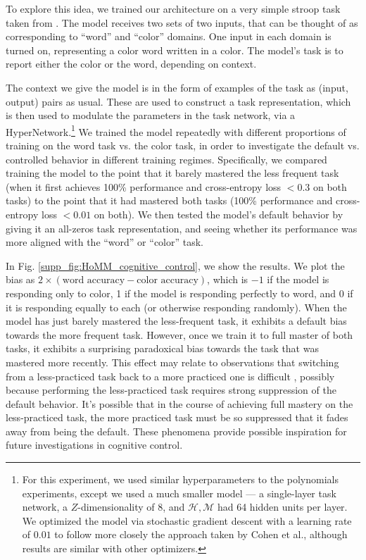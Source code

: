 To explore this idea, we trained our architecture on a very simple stroop task taken from \citet{Cohen1990}. The model receives two sets of two inputs, that can be thought of as corresponding to ``word'' and ``color'' domains. One input in each domain is turned on, representing a color word written in a color. The model's task is to report either the color or the word, depending on context.

The context we give the model is in the form of examples of the task as (input, output) pairs as usual. These are used to construct a task representation, which is then used to modulate the parameters in the task network, via a HyperNetwork.\footnote{For this experiment, we used similar hyperparameters to the polynomials experiments, except we used a much smaller model --- a single-layer task network, a $Z$-dimensionality of 8, and $\mathcal{H}, \mathcal{M}$ had 64 hidden units per layer. We optimized the model via stochastic gradient descent with a learning rate of \(0.01\) to follow more closely the approach taken by Cohen et al., although results are similar with other optimizers.} We trained the model repeatedly with different proportions of training on the word task vs. the color task, in order to investigate the default vs. controlled behavior in different training regimes. Specifically, we compared training the model to the point that it barely mastered the less frequent task (when it first achieves 100\% performance and cross-entropy loss \(< 0.3\) on both tasks) to the point that it had mastered both tasks (100\% performance and cross-entropy loss \(<0.01\) on both). We then tested the model's default behavior by giving it an all-zeros task representation, and seeing whether its performance was more aligned with the ``word'' or ``color'' task.

In Fig. \ref{supp_fig:HoMM_cognitive_control}, we show the results. We plot the bias as \(2 \times (\text{word accuracy} - \text{color accuracy})\), which is \(-1\) if the model is responding only to color, 1 if the model is responding perfectly to word, and 0 if it is responding equally to each (or otherwise responding randomly). When the model has just barely mastered the less-frequent task, it exhibits a default bias towards the more frequent task. However, once we train it to full master of both tasks, it exhibits a surprising paradoxical bias towards the task that was mastered more recently. This effect may relate to observations that switching from a less-practiced task back to a more practiced one is difficult \citep{Monsell2003}, possibly because performing the less-practiced task requires strong suppression of the default behavior. It's possible that in the course of achieving full mastery on the less-practiced task, the more practiced task must be so suppressed that it fades away from being the default. These phenomena provide possible inspiration for future investigations in cognitive control.


